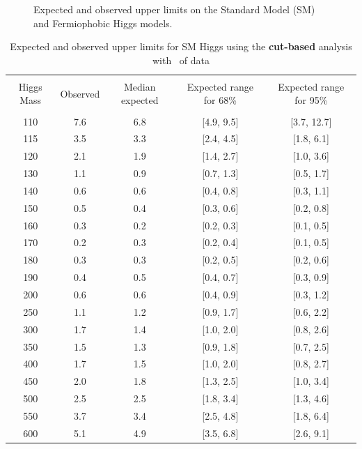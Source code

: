 \begin{figure}[!hbtp]

\caption{Expected and observed upper limits on the Standard Model (SM)
  and Fermiophobic Higgs models.}
\label{fig:uls}
\end{figure}


\begin{table}[hbp!]
\begin{center}
\begin{tabular}{c c c c c}
\hline
\vspace{-3mm} && \\
 Higgs Mass   & Observed & Median expected & Expected range for 68\% & Expected range for 95\%   \\
\vspace{-3mm} && \\
\hline
110 & 7.6 & 6.8 & [4.9, 9.5] & [3.7, 12.7] \\
115 & 3.5 & 3.3 & [2.4, 4.5] & [1.8, 6.1] \\
120 & 2.1 & 1.9 & [1.4, 2.7] & [1.0, 3.6] \\
130 & 1.1 & 0.9 & [0.7, 1.3] & [0.5, 1.7] \\
140 & 0.6 & 0.6 & [0.4, 0.8] & [0.3, 1.1] \\
150 & 0.5 & 0.4 & [0.3, 0.6] & [0.2, 0.8] \\
160 & 0.3 & 0.2 & [0.2, 0.3] & [0.1, 0.5] \\
170 & 0.2 & 0.3 & [0.2, 0.4] & [0.1, 0.5] \\
180 & 0.3 & 0.3 & [0.2, 0.5] & [0.2, 0.6] \\
190 & 0.4 & 0.5 & [0.4, 0.7] & [0.3, 0.9] \\
200 & 0.6 & 0.6 & [0.4, 0.9] & [0.3, 1.2] \\
250 & 1.1 & 1.2 & [0.9, 1.7] & [0.6, 2.2] \\
300 & 1.7 & 1.4 & [1.0, 2.0] & [0.8, 2.6] \\
350 & 1.5 & 1.3 & [0.9, 1.8] & [0.7, 2.5] \\
400 & 1.7 & 1.5 & [1.0, 2.0] & [0.8, 2.7] \\
450 & 2.0 & 1.8 & [1.3, 2.5] & [1.0, 3.4] \\
500 & 2.5 & 2.5 & [1.8, 3.4] & [1.3, 4.6] \\
550 & 3.7 & 3.4 & [2.5, 4.8] & [1.8, 6.4] \\
600 & 5.1 & 4.9 & [3.5, 6.8] & [2.6, 9.1] \\
\hline
\end{tabular}
\caption{Expected and observed upper limits for SM Higgs using the
  {\bf cut-based} analysis with \intlumi\ of data}
\label{tab:cutbase_uls}
\end{center}
\end{table}
